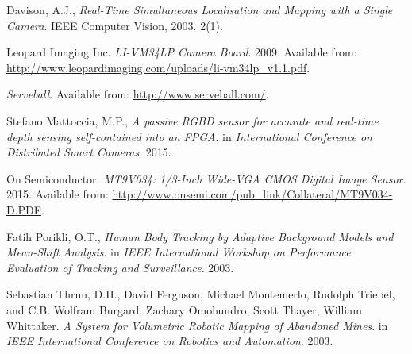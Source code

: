 \begin{thebibliography}{9}

Davison, A.J.,
\textit{Real-Time Simultaneous Localisation and Mapping with a Single Camera}. 
IEEE Computer Vision, 2003. 2(1).

Leopard Imaging Inc.
\textit{LI-VM34LP Camera Board}. 2009.
Available from: \url{http://www.leopardimaging.com/uploads/li-vm34lp_v1.1.pdf}.

\textit{Serveball}.
Available from: \url{http://www.serveball.com/}.

Stefano Mattoccia, M.P.,
\textit{A passive RGBD sensor for accurate and real-time depth sensing self-contained into an FPGA}.
in \textit{International Conference on Distributed Smart Cameras}. 2015.


On Semiconductor. 
\textit{MT9V034: 1/3-Inch Wide-VGA CMOS Digital Image Sensor}. 2015. 
Available from: \url{http://www.onsemi.com/pub_link/Collateral/MT9V034-D.PDF}.

Fatih Porikli, O.T.,
\textit{Human Body Tracking by Adaptive Background Models and Mean-Shift Analysis}.
in \textit{IEEE International Workshop on Performance Evaluation of Tracking and Surveillance}. 2003.

Sebastian Thrun, D.H., David Ferguson, Michael Montemerlo, Rudolph Triebel, and C.B. Wolfram Burgard, Zachary Omohundro, Scott Thayer, William Whittaker.
\textit{A System for Volumetric Robotic Mapping of Abandoned Mines}. 
in \textit{IEEE International Conference on Robotics and Automation}. 2003.

\end{thebibliography}

